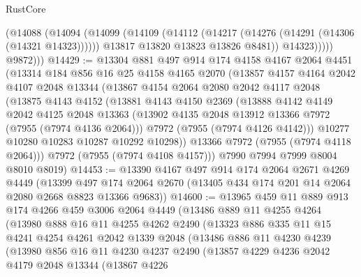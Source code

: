 \begin{lexlean}{RustCore}
\begin{coremodule}
                (@14088
                  (@14094
                    (@14099
                      (@14109
                        (@14112 (@14217 (@14276 (@14291 (@14306 (@14321 @14323))))))
                        @13817
                        @13820
                        @13823
                        @13826
                        @8481))
                    @14323)))))
          @9872)))
@14429 := @13304
    @881
    @497
    @914
    @174
    @4158
    @4167
    @2064
    @4451
    (@13314
      @184
      @856
      @16
      @25
      @4158
      @4165
      @2070
      (@13857
        @4157
        @4164
        @2042
        @4107
        @2048
        @13344
        (@13867
          @4154
          @2064
          @2080
          @2042
          @4117
          @2048
          (@13875
            @4143
            @4152
            (@13881
              @4143
              @4150
              @2369
              (@13888
                @4142
                @4149
                @2042
                @4125
                @2048
                @13363
                (@13902 @4135 @2048 @13912 @13366 @7972 (@7955 (@7974 @4136 @2064)))
                @7972
                (@7955 (@7974 @4126 @4142)))
              @10277
              @10280
              @10283
              @10287
              @10292
              @10298))
          @13366
          @7972
          (@7955 (@7974 @4118 @2064)))
        @7972
        (@7955 (@7974 @4108 @4157)))
      @7990
      @7994
      @7999
      @8004
      @8010
      @8019)
@14453 := @13390
    @4167
    @497
    @914
    @174
    @2064
    @2671
    @4269
    @4449
    (@13399 @497 @174 @2064 @2670 (@13405 @434 @174 @201 @14 @2064 @2080 @2668 @8823 @13366 @9683))
@14600 := @13965
    @459
    @11
    @889
    @913
    @174
    @4266
    @459
    @3006
    @2064
    @4449
    (@13486
      @889
      @11
      @4255
      @4264
      (@13980
        @888
        @16
        @11
        @4255
        @4262
        @2490
        (@13323
          @886
          @335
          @11
          @15
          @4241
          @4254
          @4261
          @2042
          @1339
          @2048
          (@13486
            @886
            @11
            @4230
            @4239
            (@13980
              @856
              @16
              @11
              @4230
              @4237
              @2490
              (@13857
                @4229
                @4236
                @2042
                @4179
                @2048
                @13344
                (@13867
                  @4226

\end{coremodule}
\end{lexlean}
